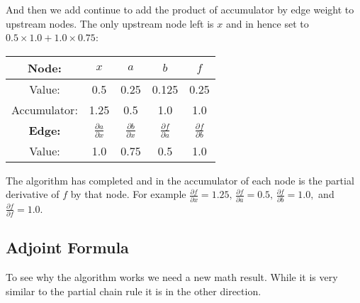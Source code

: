 And then we add continue to add the product of accumulator by edge weight to upstream nodes.
The only upstream node left is $x$ and in hence set to $0.5\times1.0+1.0\times0.75$:
\begin{multicols}{2}
	\columnbreak
	\centering
	\begin{center}
\begin{tabular}{|c|c|c|c|c|}
	\hline
	\bf Node:\phantom{\bigg|} &$x$&$a$&$b$&$f$\\
	\hline
	Value: &0.5&0.25&0.125&0.25\\
	Accumulator: &1.25&0.5&1.0&1.0\\
	\hline
	\hline
	\bf Edge:\phantom{\bigg|} &$\frac{\partial a}{\partial x}$&$\frac{\partial b}{\partial x}$&$\frac{\partial f}{\partial a}$&$\frac{\partial f}{\partial b}$\\
	\hline
	Value: &1.0&0.75&0.5&1.0\\
	\hline
\end{tabular}
	\end{center}
\end{multicols}

The algorithm has completed and in the accumulator of each node is the partial derivative of $f$ by that node.
For example $\frac{\partial f}{\partial x} = 1.25,\,\frac{\partial f}{\partial a} = 0.5,\,\frac{\partial f}{\partial b} = 1.0,$ and $\frac{\partial f}{\partial f} = 1.0$.

\subsection{Adjoint Formula}
To see why the algorithm works we need a new math result.
While it is very similar to the partial chain rule it is in the other direction.
\\

